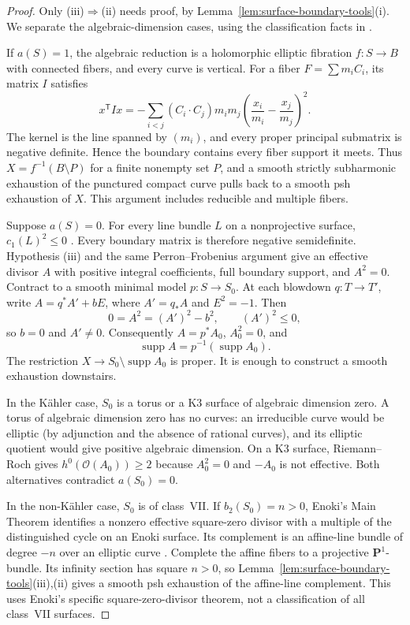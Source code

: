 \documentclass[11pt]{amsart}
\theoremstyle{definition}
\theoremstyle{remark}
\numberwithin{equation}{section}
\newcommand{\PP}{\mathbf P}
\newcommand{\OO}{\mathcal O}
\newcommand{\supp}{\operatorname{supp}}
\begin{document}
\begin{proof}
Only \textup{(iii)}$\Rightarrow$\textup{(ii)} needs proof, by
Lemma~\ref{lem:surface-boundary-tools}\textup{(i)}. We separate the
algebraic-dimension cases, using the classification facts in
\cite[Section~2]{FN2005}.

If $a(S)=1$, the algebraic reduction is a holomorphic elliptic
fibration $f:S\to B$ with connected fibers, and every curve is
vertical. For a fiber $F=\sum m_iC_i$, its matrix $I$ satisfies
\begin{equation}\label{eq:surface-fiber-intersection-identity}
 x^{\mathsf T}Ix=-\sum_{i<j}(C_i\cdot C_j)m_im_j
       \left(\frac{x_i}{m_i}-\frac{x_j}{m_j}\right)^2.
\end{equation}
The kernel is the line spanned by $(m_i)$, and every proper principal
submatrix is negative definite. Hence the boundary contains every
fiber support it meets. Thus $X=f^{-1}(B\setminus P)$ for a finite
nonempty set $P$, and a smooth strictly subharmonic exhaustion of the
punctured compact curve pulls back to a smooth psh exhaustion of $X$.
This argument includes reducible and multiple fibers.

Suppose $a(S)=0$. For every line bundle $L$ on a nonprojective surface,
$c_1(L)^2\le0$ \cite[Lemma~2.1]{FN2005}. Every boundary matrix is
therefore negative semidefinite. Hypothesis \textup{(iii)} and the
same Perron--Frobenius argument give an effective divisor $A$ with
positive integral coefficients, full boundary support, and $A^2=0$.
Contract to a smooth minimal model $p:S\to S_0$. At each blowdown
$q:T\to T'$, write $A=q^*A'+bE$, where $A'=q_*A$ and $E^2=-1$.
Then
\[
 0=A^2=(A')^2-b^2,\qquad (A')^2\le0,
\]
so $b=0$ and $A'\ne0$. Consequently $A=p^*A_0$, $A_0^2=0$, and
\[
 \supp A=p^{-1}(\supp A_0).
\]
The restriction $X\to S_0\setminus\supp A_0$ is proper. It is enough
to construct a smooth exhaustion downstairs.

In the K\"ahler case, $S_0$ is a torus or a K3 surface of algebraic
dimension zero. A torus of algebraic dimension zero has no curves:
an irreducible curve would be elliptic (by adjunction and the absence
of rational curves), and its elliptic quotient would give positive
algebraic dimension. On a K3 surface, Riemann--Roch gives
$h^0(\OO(A_0))\ge2$ because $A_0^2=0$ and $-A_0$ is not effective.
Both alternatives contradict $a(S_0)=0$.

In the non-K\"ahler case, $S_0$ is of class~VII. If $b_2(S_0)=n>0$,
Enoki's Main Theorem \cite[p.~454]{Enoki} identifies a nonzero
effective square-zero divisor with a multiple of the distinguished
cycle on an Enoki surface. Its complement is an affine-line bundle
of degree $-n$ over an elliptic curve \cite[(0.4), p.~453]{Enoki}.
Complete the affine fibers to a projective $\PP^1$-bundle. Its infinity
section has square $n>0$, so
Lemma~\ref{lem:surface-boundary-tools}\textup{(iii),(ii)} gives a smooth
psh exhaustion of the affine-line complement. This uses Enoki's
specific square-zero-divisor theorem, not a classification of all
class~VII surfaces.


\end{proof}
\end{document}
